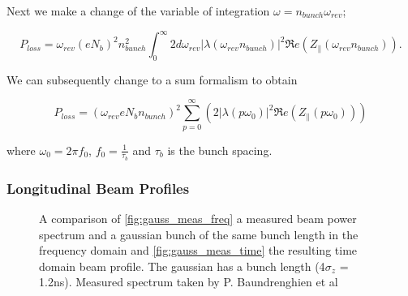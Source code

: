 Next we make a change of the variable of integration $\omega = n_{bunch}\omega_{rev}$;

\begin{equation}
P_{loss}   =  \omega_{rev} \left( eN_{b}   \right)^{2}n_{bunch}^{2} \int^{\infty}_{0} 2 d\omega_{rev} \left| \lambda \left( \omega_{rev}n_{bunch} \right)  \right|^{2}  \Re{}e \left( Z_{\parallel} \left( \omega_{rev}n_{bunch}\right)  \right).
\end{equation}

We can subsequently change to a sum formalism to obtain

\begin{equation}
P_{loss} = \left( \omega_{rev}eN_{b}n_{bunch}  \right)^{2} \displaystyle\sum\limits_{p = 0}^{\infty} \left( 2 \left| \lambda \left(p \omega_{0} \right)  \right|^{2}  \Re{}e \left( Z_{\parallel} \left(p \omega_{0} \right) \right) \right) 
\label{eqn:heating-gen}
\end{equation}

where $\omega_{0} = 2\pi f_{0}$, $f_{0} = \frac{1}{\tau_{b}}$ and $\tau_{b}$ is the bunch spacing.

\subsubsection{Longitudinal Beam Profiles}

\begin{figure}
\caption{A comparison of \ref{fig:gauss_meas_freq} a measured beam power spectrum and a gaussian bunch of the same bunch length in the frequency domain and \ref{fig:gauss_meas_time} the resulting time domain beam profile. The gaussian has a bunch length (4$\sigma_{z}$ = 1.2ns). Measured spectrum taken by P. Baundrenghien et al \cite{Baudrenghien:LHCPowSpec}}
\label{fig:measured_gauss}
\end{figure}

